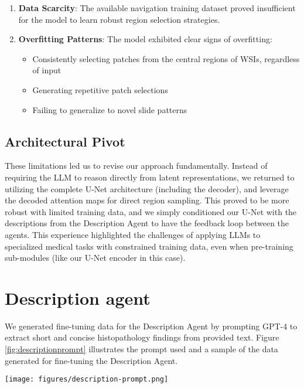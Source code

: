\begin{enumerate}
    \item \textbf{Data Scarcity}: The available navigation training dataset proved insufficient for the model to learn robust region selection strategies.
    
    \item \textbf{Overfitting Patterns}: The model exhibited clear signs of overfitting:
    \begin{itemize}
        \item Consistently selecting patches from the central regions of WSIs, regardless of input
        \item Generating repetitive patch selections
        \item Failing to generalize to novel slide patterns
    \end{itemize}
\end{enumerate}

\subsection{Architectural Pivot}
These limitations led us to revise our approach fundamentally. Instead of requiring the LLM to reason directly from latent representations, we returned to utilizing the complete U-Net architecture (including the decoder), and leverage the decoded attention maps for direct region sampling. This proved to be more robust with limited training data, and we simply conditioned our U-Net with the descriptions from the Description Agent to have the feedback loop between the agents. This experience highlighted the challenges of applying LLMs to specialized medical tasks with constrained training data, even when pre-training sub-modules (like our U-Net encoder in this case).



\section{Description agent}

We generated fine-tuning data for the Description Agent by prompting GPT-4 to extract short and concise histopathology findings from provided text. Figure \ref{fig:descriptionprompt} illustrates the prompt used and a sample of the data generated for fine-tuning the Description Agent.

\begin{figure*}[h]
\begin{center}
\texttt{[image: figures/description-prompt.png]}
\end{center}
   \caption{GPT-4 prompt to generate instruction-tuning dataset for the Description Agent.}
\label{fig:descriptionprompt}
\end{figure*}






